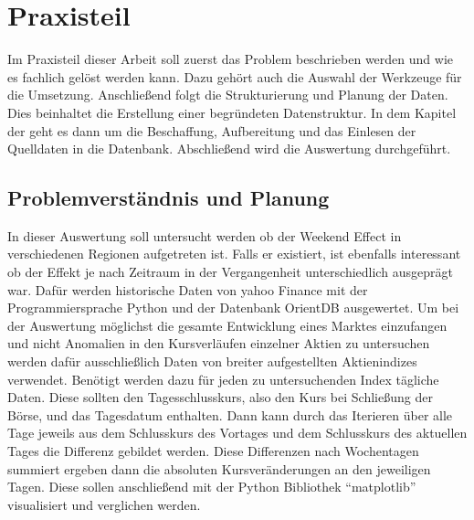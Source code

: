 \section{Praxisteil}


Im Praxisteil dieser Arbeit soll zuerst das Problem beschrieben werden und wie es fachlich gelöst werden kann. Dazu gehört auch die Auswahl der Werkzeuge für die Umsetzung. Anschließend folgt die Strukturierung und Planung der Daten. Dies beinhaltet die Erstellung einer begründeten Datenstruktur. In dem Kapitel der  geht es dann um die Beschaffung, Aufbereitung und das Einlesen der Quelldaten in die Datenbank. Abschließend wird die Auswertung durchgeführt.

\subsection{Problemverständnis und Planung}
\label{sec:planung}


In dieser Auswertung soll untersucht werden ob der Weekend Effect in verschiedenen Regionen aufgetreten ist. Falls er existiert, ist ebenfalls interessant ob der Effekt je nach Zeitraum in der Vergangenheit unterschiedlich ausgeprägt war. Dafür werden historische Daten von yahoo Finance mit der Programmiersprache Python und der Datenbank OrientDB ausgewertet. Um bei der Auswertung möglichst die gesamte Entwicklung eines Marktes einzufangen und nicht Anomalien in den Kursverläufen einzelner Aktien zu untersuchen werden dafür ausschließlich Daten von breiter aufgestellten Aktienindizes verwendet. Benötigt werden dazu für jeden zu untersuchenden Index tägliche Daten. Diese sollten den Tagesschlusskurs, also den Kurs bei Schließung der Börse, und das Tagesdatum enthalten. Dann kann durch das Iterieren über alle Tage jeweils aus dem Schlusskurs des Vortages und dem Schlusskurs des aktuellen Tages die Differenz gebildet werden. Diese Differenzen nach Wochentagen summiert ergeben dann die absoluten Kursveränderungen an den jeweiligen Tagen. Diese sollen anschließend mit der Python Bibliothek \enquote{matplotlib} visualisiert und verglichen werden.

